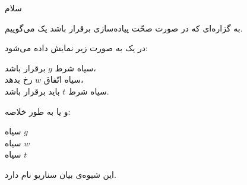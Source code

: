 

سلام

 به گزاره‌ای که در صورت صحّت پیاده‌سازی برقرار باشد یک
 می‌گوییم.   

در  یک  به صورت زیر نمایش
داده می‌شود:

{
‌سیاه{} شرط $g$ برقرار باشد، \\
‌سیاه{} اتّفاق $w$ رخ بدهد، \\
‌سیاه{} شرط $t$ باید برقرار باشد.
}

و یا به طور خلاصه:

{
‌سیاه{} $g$ \\
‌سیاه{} $w$ \\
‌سیاه{} $t$
}

این شیوه‌ی بیان سناریو  نام دارد.



